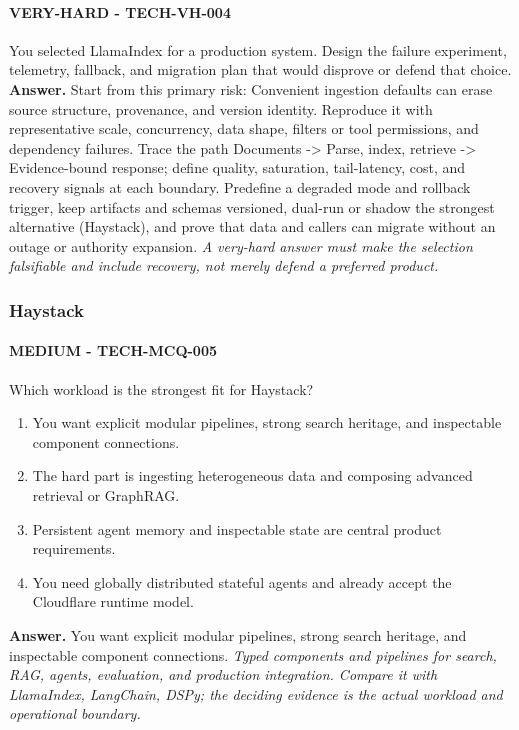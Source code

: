 \paragraph{VERY-HARD - TECH-VH-004} You selected LlamaIndex for a production system. Design the failure experiment, telemetry, fallback, and migration plan that would disprove or defend that choice.
\textbf{Answer.} Start from this primary risk: Convenient ingestion defaults can erase source structure, provenance, and version identity. Reproduce it with representative scale, concurrency, data shape, filters or tool permissions, and dependency failures. Trace the path Documents -> Parse, index, retrieve -> Evidence-bound response; define quality, saturation, tail-latency, cost, and recovery signals at each boundary. Predefine a degraded mode and rollback trigger, keep artifacts and schemas versioned, dual-run or shadow the strongest alternative (Haystack), and prove that data and callers can migrate without an outage or authority expansion.
\textit{A very-hard answer must make the selection falsifiable and include recovery, not merely defend a preferred product.}
\subsubsection*{Haystack}
\paragraph{MEDIUM - TECH-MCQ-005} Which workload is the strongest fit for Haystack?
\begin{enumerate}[label=\Alph*.]
\item You want explicit modular pipelines, strong search heritage, and inspectable component connections.
\item The hard part is ingesting heterogeneous data and composing advanced retrieval or GraphRAG.
\item Persistent agent memory and inspectable state are central product requirements.
\item You need globally distributed stateful agents and already accept the Cloudflare runtime model.
\end{enumerate}
\textbf{Answer.} You want explicit modular pipelines, strong search heritage, and inspectable component connections.
\textit{Typed components and pipelines for search, RAG, agents, evaluation, and production integration. Compare it with LlamaIndex, LangChain, DSPy; the deciding evidence is the actual workload and operational boundary.}
